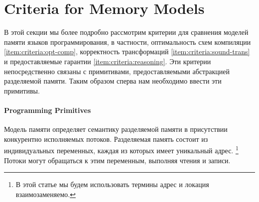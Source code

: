 \section{Criteria for Memory Models}
\label{sec:background}

В этой секции мы более подробно рассмотрим 
критерии для сравнения моделей памяти языков программирования,
в частности, оптимальность схем компиляции \ref{item:criteria:opt-comp},
корректность трансформаций \ref{item:criteria:sound-trans}
и предоставляемые гарантии \ref{item:criteria:reasoning}.
Эти критерии непосредственно связаны с примитивами, 
предоставляемыми абстракцией разделяемой памяти. 
Таким образом сперва нам необходимо ввести эти примитивы. 

\paragraph{Programming Primitives}
\label{sec:background:primitives}

Модель памяти определяет семантику разделяемой памяти
в присутствии конкурентно исполняемых потоков. 
Разделяемая память состоит из индивидуальных переменных, 
каждая из которых имеет уникальный адрес.%
\footnote{В этой статье мы будем использовать 
термины адрес и локация взаимозаменяемо.}
Потоки могут обращаться к этим переменным, 
выполняя чтения и записи. 

